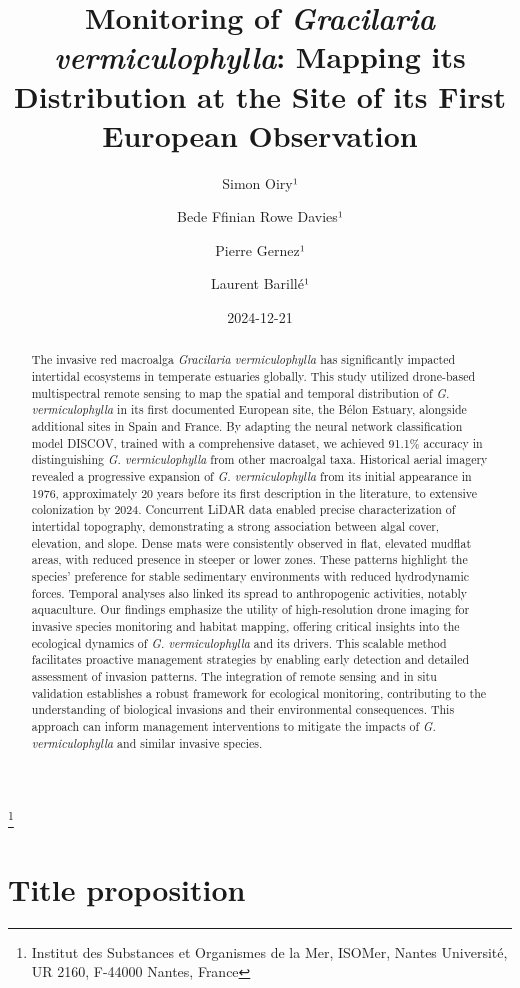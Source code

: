 \documentclass[
  letterpaper,
  DIV=11,
  numbers=noendperiod]{scrartcl}
\title{Monitoring of \emph{Gracilaria vermiculophylla}: Mapping its
Distribution at the Site of its First European Observation}
\author{Simon Oiry¹ \and Bede Ffinian Rowe Davies¹ \and Pierre
Gernez¹ \and Laurent Barillé¹}
\date{2024-12-21}
\begin{document}
\maketitle
\begin{abstract}
The invasive red macroalga \emph{Gracilaria vermiculophylla} has
significantly impacted intertidal ecosystems in temperate estuaries
globally. This study utilized drone-based multispectral remote sensing
to map the spatial and temporal distribution of \emph{G.
vermiculophylla} in its first documented European site, the Bélon
Estuary, alongside additional sites in Spain and France. By adapting the
neural network classification model DISCOV, trained with a comprehensive
dataset, we achieved 91.1\% accuracy in distinguishing \emph{G.
vermiculophylla} from other macroalgal taxa. Historical aerial imagery
revealed a progressive expansion of \emph{G. vermiculophylla} from its
initial appearance in 1976, approximately 20 years before its first
description in the literature, to extensive colonization by 2024.
Concurrent LiDAR data enabled precise characterization of intertidal
topography, demonstrating a strong association between algal cover,
elevation, and slope. Dense mats were consistently observed in flat,
elevated mudflat areas, with reduced presence in steeper or lower zones.
These patterns highlight the species' preference for stable sedimentary
environments with reduced hydrodynamic forces. Temporal analyses also
linked its spread to anthropogenic activities, notably aquaculture. Our
findings emphasize the utility of high-resolution drone imaging for
invasive species monitoring and habitat mapping, offering critical
insights into the ecological dynamics of \emph{G. vermiculophylla} and
its drivers. This scalable method facilitates proactive management
strategies by enabling early detection and detailed assessment of
invasion patterns. The integration of remote sensing and in situ
validation establishes a robust framework for ecological monitoring,
contributing to the understanding of biological invasions and their
environmental consequences. This approach can inform management
interventions to mitigate the impacts of \emph{G. vermiculophylla} and
similar invasive species.
\end{abstract}


\footnote{Institut des Substances et Organismes de la Mer, ISOMer,
  Nantes Université, UR 2160, F-44000 Nantes, France}

\section{Title proposition}\label{title-proposition}
\end{document}
